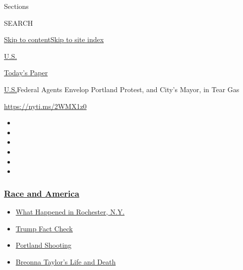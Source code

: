 Sections

SEARCH

\protect\hyperlink{site-content}{Skip to
content}\protect\hyperlink{site-index}{Skip to site index}

\href{https://www.nytimes3xbfgragh.onion/section/us}{U.S.}

\href{https://myaccount.nytimes3xbfgragh.onion/auth/login?response_type=cookie\&client_id=vi}{}

\href{https://www.nytimes3xbfgragh.onion/section/todayspaper}{Today's
Paper}

\href{/section/us}{U.S.}\textbar{}Federal Agents Envelop Portland
Protest, and City's Mayor, in Tear Gas

\url{https://nyti.ms/2WMX1z0}

\begin{itemize}
\item
\item
\item
\item
\item
\item
\end{itemize}

\hypertarget{race-and-america}{%
\subsubsection{\texorpdfstring{\href{https://www.nytimes3xbfgragh.onion/news-event/george-floyd-protests-minneapolis-new-york-los-angeles?name=styln-george-floyd\&region=TOP_BANNER\&block=storyline_menu_recirc\&action=click\&pgtype=Article\&impression_id=f15c43a0-f2cb-11ea-a7a0-bdf104929079\&variant=undefined}{Race
and America}}{Race and America}}\label{race-and-america}}

\begin{itemize}
\tightlist
\item
  \href{https://www.nytimes3xbfgragh.onion/2020/09/04/nyregion/rochester-police-daniel-prude.html?name=styln-george-floyd\&region=TOP_BANNER\&block=storyline_menu_recirc\&action=click\&pgtype=Article\&impression_id=f15c6ab0-f2cb-11ea-a7a0-bdf104929079\&variant=undefined}{What
  Happened in Rochester, N.Y.}
\item
  \href{https://www.nytimes3xbfgragh.onion/2020/09/01/us/politics/trump-fact-check-protests.html?name=styln-george-floyd\&region=TOP_BANNER\&block=storyline_menu_recirc\&action=click\&pgtype=Article\&impression_id=f15c6ab1-f2cb-11ea-a7a0-bdf104929079\&variant=undefined}{Trump
  Fact Check}
\item
  \href{https://www.nytimes3xbfgragh.onion/2020/08/30/us/portland-shooting-explained.html?name=styln-george-floyd\&region=TOP_BANNER\&block=storyline_menu_recirc\&action=click\&pgtype=Article\&impression_id=f15c6ab2-f2cb-11ea-a7a0-bdf104929079\&variant=undefined}{Portland
  Shooting}
\item
  \href{https://www.nytimes3xbfgragh.onion/2020/08/30/us/breonna-taylor-police-killing.html?name=styln-george-floyd\&region=TOP_BANNER\&block=storyline_menu_recirc\&action=click\&pgtype=Article\&impression_id=f15c6ab3-f2cb-11ea-a7a0-bdf104929079\&variant=undefined}{Breonna
  Taylor's Life and Death}
\end{itemize}

